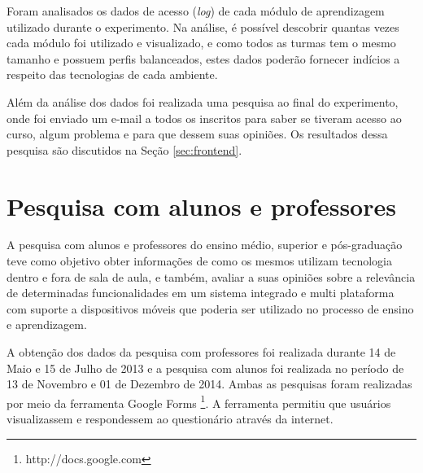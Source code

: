 Foram analisados os dados de acesso (\emph{log}) de cada módulo de aprendizagem utilizado durante o experimento. Na análise, é possível descobrir quantas vezes cada módulo foi utilizado e visualizado, e como todos as turmas tem o mesmo tamanho e possuem perfis balanceados, estes dados poderão fornecer indícios a respeito das tecnologias de cada ambiente. 

Além da análise dos dados foi realizada uma pesquisa ao final do experimento, onde foi enviado um e-mail a todos os inscritos para saber se tiveram acesso ao curso, algum problema e para que dessem suas opiniões. Os resultados dessa pesquisa são discutidos na Seção \ref{sec:frontend}.




\section{Pesquisa com alunos e professores}
\label{sec:metodologia_professores}

A pesquisa com alunos e professores do ensino médio, superior e pós-graduação teve como objetivo obter informações de como os mesmos utilizam tecnologia dentro e fora de sala de aula, e também, avaliar a suas opiniões sobre a relevância de determinadas funcionalidades em um sistema integrado e multi plataforma com suporte a dispositivos móveis que poderia ser utilizado no processo de ensino e aprendizagem.

A obtenção dos dados da pesquisa com professores foi realizada durante 14 de Maio e 15 de Julho de 2013 e a pesquisa com alunos foi realizada no período de 13 de Novembro e 01 de Dezembro de 2014. Ambas as pesquisas foram realizadas por meio da ferramenta Google Forms \footnote{http://docs.google.com}. A ferramenta permitiu que usuários visualizassem e respondessem ao questionário através da internet. 

